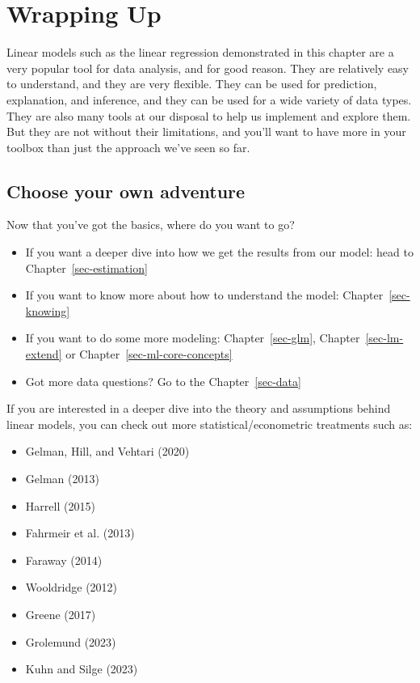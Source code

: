 \documentclass[
  letterpaper,
]{krantz}
\providecommand{\tightlist}{%
  \setlength{\itemsep}{0pt}\setlength{\parskip}{0pt}}\usepackage{longtable,booktabs,array}
\begin{document}
\section{Wrapping Up}\label{sec-lm-wrap}

Linear models such as the linear regression demonstrated in this chapter
are a very popular tool for data analysis, and for good reason. They are
relatively easy to understand, and they are very flexible. They can be
used for prediction, explanation, and inference, and they can be used
for a wide variety of data types. They are also many tools at our
disposal to help us implement and explore them. But they are not without
their limitations, and you'll want to have more in your toolbox than
just the approach we've seen so far.

\subsection{Choose your own adventure}\label{sec-lm-adventure}

Now that you've got the basics, where do you want to go?

\begin{itemize}
\tightlist
\item
  If you want a deeper dive into how we get the results from our model:
  head to Chapter~\ref{sec-estimation}
\item
  If you want to know more about how to understand the model:
  Chapter~\ref{sec-knowing}
\item
  If you want to do some more modeling: Chapter~\ref{sec-glm},
  Chapter~\ref{sec-lm-extend} or Chapter~\ref{sec-ml-core-concepts}
\item
  Got more data questions? Go to the Chapter~\ref{sec-data}
\end{itemize}

If you are interested in a deeper dive into the theory and assumptions
behind linear models, you can check out more statistical/econometric
treatments such as:

\begin{itemize}
\tightlist
\item
  Gelman, Hill, and Vehtari (2020)
\item
  Gelman (2013)
\item
  Harrell (2015)
\item
  Fahrmeir et al. (2013)
\item
  Faraway (2014)
\item
  Wooldridge (2012)
\item
  Greene (2017)
\item
  Grolemund (2023)
\item
  Kuhn and Silge (2023)
\end{itemize}
\end{document}
